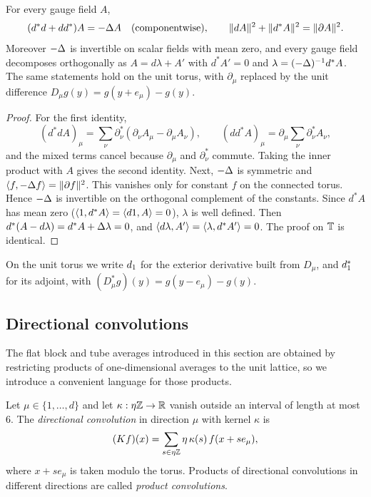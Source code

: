 \begin{lemma}\label{lem:hodge}
For every gauge field $A$,
\[
(d^*d+dd^*)A=-\Delta A\quad\text{(componentwise)},\qquad
\|dA\|^2+\|d^*A\|^2=\|\partial A\|^2 .
\]
Moreover $-\Delta$ is invertible on scalar fields with mean zero, and every gauge field decomposes orthogonally as $A=d\lambda+A'$ with $d^*A'=0$ and $\lambda=(-\Delta)^{-1}d^*A$. The same statements hold on the unit torus, with $\partial_\mu$ replaced by the unit difference $D_\mu g(y)=g(y+e_\mu)-g(y)$.
\end{lemma}

\begin{proof}
For the first identity,
\[
(d^*dA)_\mu=\sum_\nu\partial^*_\nu(\partial_\nu A_\mu-\partial_\mu A_\nu),\qquad (dd^*A)_\mu=\partial_\mu\sum_\nu\partial^*_\nu A_\nu,
\]
and the mixed terms cancel because $\partial_\mu$ and $\partial^*_\nu$ commute. Taking the inner product with $A$ gives the second identity. Next, $-\Delta$ is symmetric and $\langle f,-\Delta f\rangle=\|\partial f\|^2$. This vanishes only for constant $f$ on the connected torus. Hence $-\Delta$ is invertible on the orthogonal complement of the constants. Since $d^*A$ has mean zero ($\langle 1,d^*A\rangle=\langle d1,A\rangle=0$), $\lambda$ is well defined. Then $d^*(A-d\lambda)=d^*A+\Delta\lambda=0$, and $\langle d\lambda,A'\rangle=\langle \lambda,d^*A'\rangle=0$. The proof on $\mathbb T$ is identical.
\end{proof}

On the unit torus we write $d_1$ for the exterior derivative built from $D_\mu$, and $d_1^*$ for its adjoint, with $(D_\mu^*g)(y)=g(y-e_\mu)-g(y)$.

\subsection{Directional convolutions}\label{ss:2.3}

The flat block and tube averages introduced in this section are obtained by restricting products of one-dimensional averages to the unit lattice, so we introduce a convenient language for those products.

\begin{definition}\label{x:2.3}
Let $\mu\in\{1,\dots,d\}$ and let $\kappa:\eta\mathbb Z\to\mathbb R$ vanish outside an interval of length at most $6$. The \emph{directional convolution} in direction $\mu$ with kernel $\kappa$ is
\[
(Kf)(x)=\sum_{s\in\eta\mathbb Z}\eta\,\kappa(s)\,f(x+se_\mu),
\]
where $x+se_\mu$ is taken modulo the torus. Products of directional convolutions in different directions are called \emph{product convolutions}.
\end{definition}

